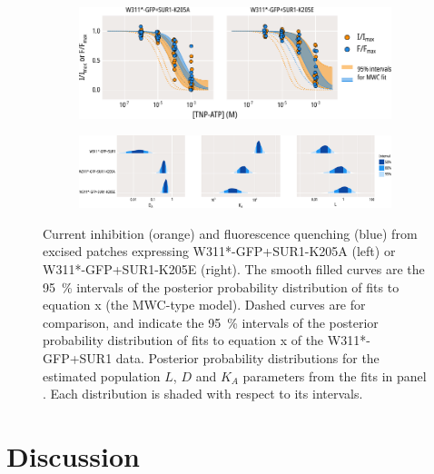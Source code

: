 \begin{figure}[h]
	\centering
	\begin{subfigure}[t]{0.9\textwidth}
		\caption{}\label{ch6fig:mwc_k205_1}
		\centering
		\includegraphics[width=\textwidth]{mwc_k205_1.pdf}
	\end{subfigure}
	\vfill
	\begin{subfigure}[t]{0.9\textwidth}
		\caption{}\label{ch6fig:mwc_k205_2}
		\centering
		\includegraphics[width=\textwidth]{mwc_k205_2.pdf}
	\end{subfigure}
	\caption[K205 mutations affect gating and nucleotide binding]{
	 Current inhibition (orange) and fluorescence quenching (blue) from excised patches expressing W311*-GFP+SUR1-K205A (left) or W311*-GFP+SUR1-K205E (right).
	The smooth filled curves are the \SI{95}{\percent} intervals of the posterior probability distribution of fits to equation x (the MWC-type model).
	Dashed curves are for comparison, and indicate the \SI{95}{\percent} intervals of the posterior probability distribution of fits to equation x of the W311*-GFP+SUR1 data.
	 Posterior probability distributions for the estimated population $L$, $D$ and $K_A$ parameters from the fits in panel .
	Each distribution is shaded with respect to its intervals.
	}\label{ch6fig:k205_fig2}
\end{figure}

\section{Discussion}

